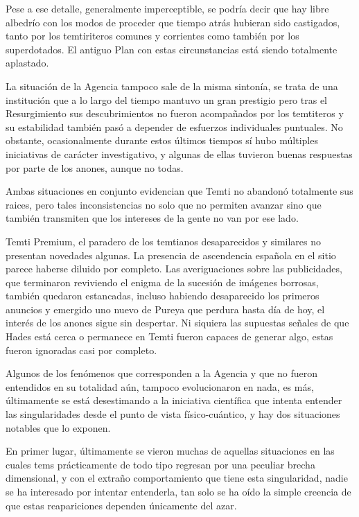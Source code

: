 \documentclass[
]{book}
\begin{document}
Pese a ese detalle, generalmente imperceptible, se podría decir que hay libre albedrío con los modos de proceder que tiempo atrás hubieran sido castigados, tanto por los temtiriteros comunes y corrientes como también por los superdotados. El antiguo Plan con estas circunstancias está siendo totalmente aplastado.

La situación de la Agencia tampoco sale de la misma sintonía, se trata de una institución que a lo largo del tiempo mantuvo un gran prestigio pero tras el Resurgimiento sus descubrimientos no fueron acompañados por los temtiteros y su estabilidad también pasó a depender de esfuerzos individuales puntuales. No obstante, ocasionalmente durante estos últimos tiempos sí hubo múltiples iniciativas de carácter investigativo, y algunas de ellas tuvieron buenas respuestas por parte de los anones, aunque no todas.

Ambas situaciones en conjunto evidencian que Temti no abandonó totalmente sus raices, pero tales inconsistencias no solo que no permiten avanzar sino que también transmiten que los intereses de la gente no van por ese lado.

Temti Premium, el paradero de los temtianos desaparecidos y similares no presentan novedades algunas. La presencia de ascendencia española en el sitio parece haberse diluido por completo. Las averiguaciones sobre las publicidades, que terminaron reviviendo el enigma de la sucesión de imágenes borrosas, también quedaron estancadas, incluso habiendo desaparecido los primeros anuncios y emergido uno nuevo de Pureya que perdura hasta día de hoy, el interés de los anones sigue sin despertar. Ni siquiera las supuestas señales de que Hades está cerca o permanece en Temti fueron capaces de generar algo, estas fueron ignoradas casi por completo.

Algunos de los fenómenos que corresponden a la Agencia y que no fueron entendidos en su totalidad aún, tampoco evolucionaron en nada, es más, últimamente se está desestimando a la iniciativa científica que intenta entender las singularidades desde el punto de vista físico-cuántico, y hay dos situaciones notables que lo exponen.

En primer lugar, últimamente se vieron muchas de aquellas situaciones en las cuales tems prácticamente de todo tipo regresan por una peculiar brecha dimensional, y con el extraño comportamiento que tiene esta singularidad, nadie se ha interesado por intentar entenderla, tan solo se ha oído la simple creencia de que estas reapariciones dependen únicamente del azar.
\end{document}
